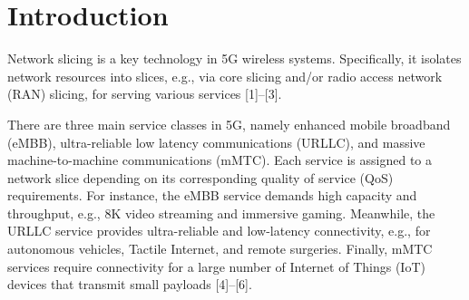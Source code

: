 \documentclass[12pt, letterpaper]{article}
\begin{document}
\section{Introduction}
Network slicing is a key technology in 5G wireless systems. Specifically, it isolates network resources into slices, e.g., via core slicing and/or radio access network (RAN) slicing, for serving various services [1]–[3]. 

There are three main service classes in 5G, namely enhanced mobile broadband (eMBB), ultra-reliable low latency communications (URLLC), and massive machine-to-machine communications (mMTC). Each service is assigned to a network slice depending on its corresponding quality of service (QoS) requirements.
For instance, the eMBB service demands high capacity and throughput,  e.g., 8K video streaming and immersive gaming. Meanwhile, the URLLC service provides ultra-reliable and low-latency connectivity, e.g., for autonomous vehicles, Tactile Internet, and remote surgeries. Finally, mMTC services require connectivity for a large number of Internet of Things (IoT) devices that transmit small payloads [4]–[6].




\end{document}
